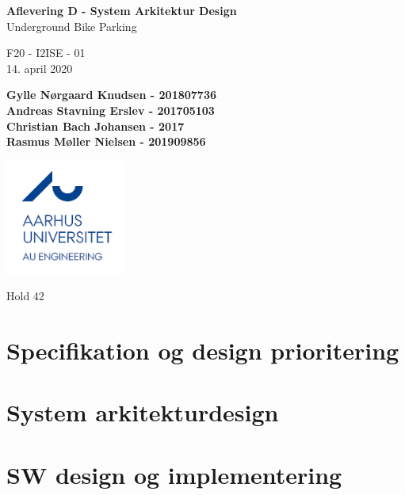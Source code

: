 \documentclass{article}
\begin{document}
\begin{titlepage}
    
    \begin{center}
        \vspace*{1cm}
 
        \Huge
        \textbf{Aflevering D - System Arkitektur Design}\\
        \Large
        Underground Bike Parking
 
        \vspace{0.5cm}
        \LARGE
        F20 - I2ISE - 01 \\
        14. april 2020
 
        \vspace{1.5cm}
        
        \large
        \textbf{Gylle Nørgaard Knudsen - 201807736 \\
Andreas Stavning Erslev - 201705103\\
Christian Bach Johansen - 2017\\
Rasmus Møller Nielsen - 201909856}
        
        \vfill
        \includegraphics[width=0.3\textwidth]{au}
        
        \vspace{1cm}
        Hold 42
 
    \end{center}
\end{titlepage}

\section{Specifikation og design prioritering}


\section{System arkitekturdesign}


\section{SW design og implementering}

\end{document}
